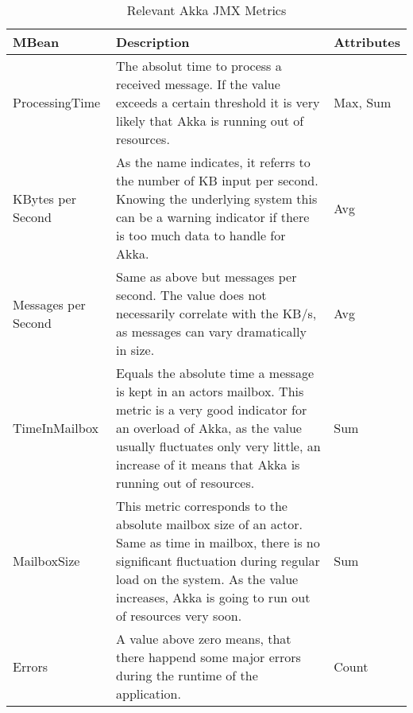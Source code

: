 \begin{table}[]
\begin{tabular}{@{}lp{8cm}l@{}}
\toprule
MBean & Description & Attributes \\ \midrule
ProcessingTime                & The absolut time to process a received message.
                                If the value exceeds a certain threshold it is very likely that Akka is running out of resources.
                              & Max, Sum \\
KBytes per Second             & As the name indicates, it referrs to the number of KB input per second.
                                Knowing the underlying system this can be a warning indicator if there is too much data to handle for Akka.
                              & Avg \\
Messages per Second           & Same as above but messages per second.
                                The value does not necessarily correlate with the KB/s, as messages can vary dramatically in size.
                              & Avg \\
TimeInMailbox                 & Equals the absolute time a message is kept in an actors mailbox.
                                This metric is a very good indicator for an overload of Akka, as the value usually fluctuates only very little, an increase of it means that Akka is running out of resources.
                              & Sum \\
MailboxSize                   & This metric corresponds to the absolute mailbox size of an actor.
                                Same as time in mailbox, there is no significant fluctuation during regular load on the system.
                                As the value increases, Akka is going to run out of resources very soon.
                              & Sum \\
Errors                        & A value above zero means, that there happend some major errors during the runtime of the application.
                              & Count \\
\bottomrule
\end{tabular}
\centering
\caption{Relevant Akka JMX Metrics}
\label{tab:jmx_akka}
\end{table}



